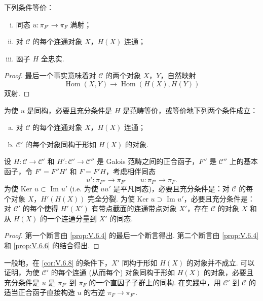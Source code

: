\begin{proposition}\label{prop:V.6.9}
下列条件等价：
\begin{enumerate}[(i)]
\item 同态 $u \colon \pi_{F'} \to \pi_F$ 满射；
\item 对 $\mathcal{C}$ 的每个连通对象 $X$，$H(X)$ 连通；
\item 函子 $H$ 全忠实.
\end{enumerate}
\end{proposition}

\begin{proof}
最后一个事实意味着对 $\mathcal{C}$ 的两个对象 $X$，$Y$，自然映射
\[
\operatorname{Hom}(X, Y) \longrightarrow \operatorname{Hom}(H(X), H(Y))
\]
双射.
\end{proof}

\begin{corollary}\label{cor:V.6.10}
为使 $u$ 是同构，必要且充分条件是 $H$ 是范畴等价，或等价地下列两个条件成立：
\begin{enumerate}[a)]
\item 对 $\mathcal{C}$ 的每个连通对象 $X$，$H(X)$ 连通；
\item $\mathcal{C}'$ 的每个对象同构于形如 $H(X)$ 的对象.
\end{enumerate}
\end{corollary}

\begin{proposition}\label{prop:V.6.11}
设 $H \colon \mathcal{C} \to \mathcal{C}'$ 和 $H' \colon \mathcal{C}' \to \mathcal{C}''$ 是 Galois 范畴之间的正合函子，$F''$ 是 $\mathcal{C}''$ 上的基本函子，令 $F' = F''H'$ 和 $F = F'H$，考虑相伴同态
\[
u' \colon \pi_{F''} \longrightarrow \pi_{F'} \qquad u \colon \pi_{F'} \longrightarrow \pi_F.
\]
为使 Ker $u \subset$ Im $u'$ (i.e. 为使 $uu'$ 是平凡同态)，必要且充分条件是：对 $\mathcal{C}$ 的每个对象 $X$，$H'(H(X))$ 完全分裂. 为使 Ker $u \supset$ Im $u'$，必要且充分条件是：对 $\mathcal{C}'$ 的每个使得 $H'(X')$ 有带点截面的连通带点对象 $X'$，存在 $\mathcal{C}$ 的对象 $X$ 和从 $H(X)$ 的一个连通分量到 $X'$ 的同态.
\end{proposition}

\begin{proof}
第一个断言由 \ref{prop:V.6.4} 的最后一个断言得出. 第二个断言由 \ref{prop:V.6.4} 和 \ref{prop:V.6.6} 的结合得出.
\end{proof}

\begin{remark}\label{rem:V.6.12}
一般地，在 \ref{cor:V.6.8} 的条件下，$X'$ 同构于形如 $H(X)$ 的对象并不成立. 可以证明，为使 $\mathcal{C}'$ 的每个连通 (从而每个) 对象同构于形如 $H(X)$ 的对象，必要且充分条件是 $u$ 是 $\pi_{F'}$ 到 $\pi_F$ 的一个直因子子群上的同构. 在实践中，用 $\mathcal{C}'$ 到 $\mathcal{C}$ 的适当正合函子直接构造 $u$ 的右逆 $\pi_F \to \pi_{F'}$.
\end{remark}

